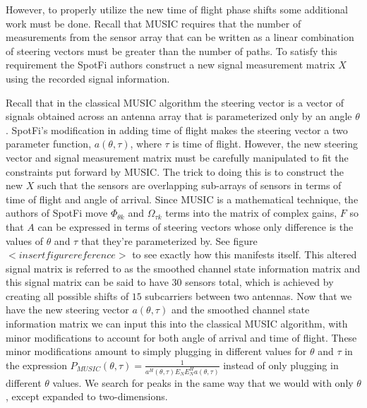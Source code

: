 \documentclass[12pt]{report}
\begin{document}
However, to properly utilize the new time of flight phase shifts some additional work must be done. Recall that MUSIC requires that the number of measurements from the sensor array that can be written as a linear combination of steering vectors must be greater than the number of paths. To satisfy this requirement the SpotFi authors construct a new signal measurement matrix $X$ using the recorded signal information. \par

Recall that in the classical MUSIC algorithm the steering vector is a vector of signals obtained across an antenna array that is parameterized only by an angle $\theta$. SpotFi's modification in adding time of flight makes the steering vector a two parameter function, $a(\theta, \tau)$, where $\tau$ is time of flight. However, the new steering vector and signal measurement matrix must be carefully manipulated to fit the constraints put forward by MUSIC. The trick to doing this is to construct the new $X$ such that the sensors are overlapping sub-arrays of sensors in terms of time of flight and angle of arrival. Since MUSIC is a mathematical technique, the authors of SpotFi move $\Phi_{\theta k}$ and $\Omega_{\tau k}$ terms into the matrix of complex gains, $F$ so that $A$ can be expressed in terms of steering vectors whose only difference is the values of $\theta$ and $\tau$ that they're parameterized by. See figure $<insert figure reference>$ to see exactly how this manifests itself. This altered signal matrix is referred to as the smoothed channel state information matrix and this signal matrix can be said to have $30$ sensors total, which is achieved by creating all possible shifts of $15$ subcarriers between two antennas. Now that we have the new steering vector $a(\theta, \tau)$ and the smoothed channel state information matrix we can input this into the classical MUSIC algorithm, with minor modifications to account for both angle of arrival and time of flight. These minor modifications amount to simply plugging in different values for $\theta$ and $\tau$ in the expression $P_{MUSIC}(\theta, \tau) = \frac{1}{a^{H}(\theta, \tau) E_{N} E^{H}_{N} a(\theta, \tau)}$ instead of only plugging in different $\theta$ values. We search for peaks in the same way that we would with only $\theta$, except expanded to two-dimensions. \par
\end{document}
